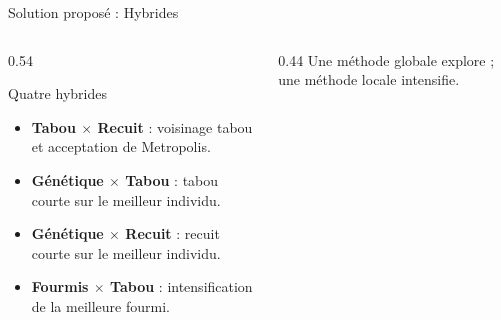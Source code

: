 \begin{frame}{Solution proposé : Hybrides}
  \footnotesize
  \begin{columns}[T,onlytextwidth]
    \begin{column}{0.54\textwidth}
      \begin{block}{Quatre hybrides}
        \begin{itemize}
          \item \textbf{Tabou $\times$ Recuit} : voisinage tabou et acceptation
            de Metropolis.
          \item \textbf{Génétique $\times$ Tabou} : tabou courte sur le meilleur
            individu.
          \item \textbf{Génétique $\times$ Recuit} : recuit courte sur le
            meilleur individu.
          \item \textbf{Fourmis $\times$ Tabou} : intensification de la
            meilleure fourmi.
        \end{itemize}
      \end{block}
    \end{column}

    \begin{column}{0.44\textwidth}
      \footnotesize
      Une méthode globale explore ; une méthode locale intensifie.

    \end{column}
  \end{columns}
\end{frame}

